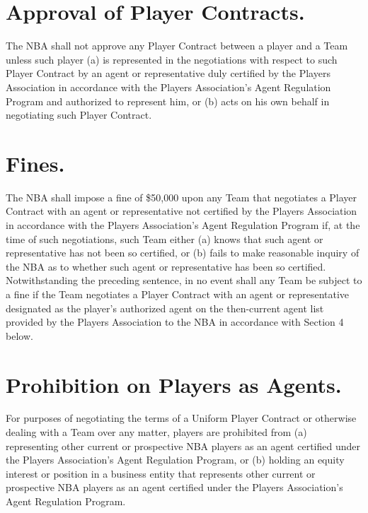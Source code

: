 \documentclass[
]{book}
\begin{document}
\hypertarget{approval-of-player-contracts.}{%
\section{Approval of Player Contracts.}\label{approval-of-player-contracts.}}

The NBA shall not approve any Player Contract between a player and a Team unless such player (a) is represented in the negotiations with respect to such Player Contract by an agent or representative duly certified by the Players Association in accordance with the Players Association's Agent Regulation Program and authorized to represent him, or (b) acts on his own behalf in negotiating such Player Contract.

\hypertarget{fines.}{%
\section{Fines.}\label{fines.}}

The NBA shall impose a fine of \$50,000 upon any Team that negotiates a Player Contract with an agent or representative not certified by the Players Association in accordance with the Players Association's Agent Regulation Program if, at the time of such negotiations, such Team either (a) knows that such agent or representative has not been so certified, or (b) fails to make reasonable inquiry of the NBA as to whether such agent or representative has been so certified. Notwithstanding the preceding sentence, in no event shall any Team be subject to a fine if the Team negotiates a Player Contract with an agent or representative designated as the player's authorized agent on the then-current agent list provided by the Players Association to the NBA in accordance with Section 4 below.

\hypertarget{prohibition-on-players-as-agents.}{%
\section{Prohibition on Players as Agents.}\label{prohibition-on-players-as-agents.}}

For purposes of negotiating the terms of a Uniform Player Contract or otherwise dealing with a Team over any matter, players are prohibited from (a) representing other current or prospective NBA players as an agent certified under the Players Association's Agent Regulation Program, or (b) holding an equity interest or position in a business entity that represents other current or prospective NBA players as an agent certified under the Players Association's Agent Regulation Program.
\end{document}
